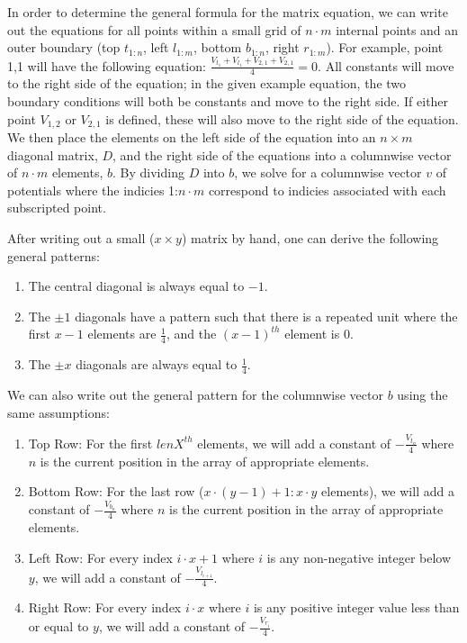 \documentclass[journal]{IEEEtran}
\begin{document}
In order to determine the general formula for the matrix equation, we can write out the equations for all points within a small grid of $n \cdot m$ internal points and an outer boundary (top $t_{1:n}$, left $l_{1:m}$, bottom $b_{1:n}$, right $r_{1:m}$).  For example, point 1,1 will have the following equation: $\frac{V_{t_1} + V_{l_1} + V_{2,1} + V_{2,1}}{4} = 0$.  All constants will move to the right side of the equation; in the given example equation, the two boundary conditions will both be constants and move to the right side.  If either point $V_{1,2}$ or $V_{2,1}$ is defined, these will also move to the right side of the equation.  We then place the elements on the left side of the equation into an $n \times m$ diagonal matrix, $D$, and the right side of the equations into a columnwise vector of $n \cdot m$ elements, $b$.  By dividing $D$ into $b$, we solve for a columnwise vector $v$ of potentials where the indicies 1:$n \cdot m$ correspond to indicies associated with each subscripted point.

After writing out a small ($x \times y$) matrix by hand, one can derive the following general patterns:

\begin{enumerate}
\item{The central diagonal is always equal to $-1$.}
\item{The $\pm1$ diagonals have a pattern such that there is a repeated unit where the first $x-1$ elements are $\frac{1}{4}$, and the $({x-1})^{th}$ element is 0.}
\item{The $\pm x$ diagonals are always equal to $\frac{1}{4}$.}
\end{enumerate}

We can also write out the general pattern for the columnwise vector $b$ using the same assumptions:

\begin{enumerate}
\item{Top Row: For the first ${lenX}^{th}$ elements, we will add a constant of $-\frac{V_{t_n}}{4}$ where $n$ is the current position in the array of appropriate elements.}
\item{Bottom Row: For the last row ($x \cdot (y - 1) + 1:x \cdot y$ elements), we will add a constant of $-\frac{V_{b_n}}{4}$ where $n$ is the current position in the array of appropriate elements.}
\item{Left Row: For every index $i \cdot x + 1$ where $i$ is any non-negative integer below $y$, we will add a constant of $-\frac{V_{l_{i+1}}}{4}$.}
\item{Right Row: For every index $i \cdot x$ where $i$ is any positive integer value less than or equal to $y$, we will add a constant of $-\frac{V_{r_i}}{4}$.}
\end{enumerate}
\end{document}
